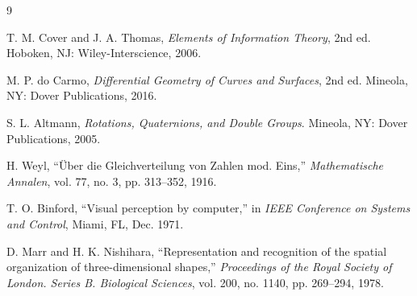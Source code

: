\documentclass[11pt,twoside]{article}
\begin{document}
\begin{thebibliography}{9}

T. M. Cover and J. A. Thomas,
\emph{Elements of Information Theory}, 2nd ed.
Hoboken, NJ: Wiley-Interscience, 2006.

M. P. do Carmo,
\emph{Differential Geometry of Curves and Surfaces}, 2nd ed.
Mineola, NY: Dover Publications, 2016.

S. L. Altmann,
\emph{Rotations, Quaternions, and Double Groups}.
Mineola, NY: Dover Publications, 2005.

H. Weyl,
``\"Uber die Gleichverteilung von Zahlen mod. Eins,''
\emph{Mathematische Annalen}, vol. 77, no. 3, pp. 313--352, 1916.

T. O. Binford,
``Visual perception by computer,''
in \emph{IEEE Conference on Systems and Control}, Miami, FL, Dec. 1971.

D. Marr and H. K. Nishihara,
``Representation and recognition of the spatial organization of three-dimensional shapes,''
\emph{Proceedings of the Royal Society of London. Series B. Biological Sciences}, vol. 200, no. 1140, pp. 269--294, 1978.

\end{thebibliography}
\end{document}
